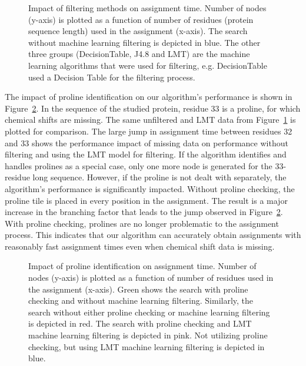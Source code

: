 \documentclass{article}
\begin{document}
\begin{figure}[H]
	\begin{center}
		\resizebox{!}{0.6\textwidth}{}
	\caption{Impact of filtering methods on assignment time. Number of nodes (y-axis) is plotted as a function of number of residues (protein sequence length) used in the assignment (x-axis). The search without machine learning filtering is depicted in blue. The other three groups (DecisionTable, J4.8 and LMT) are the machine learning algorithms that were used for filtering, e.g. DecisionTable used a Decision Table for the filtering process.}
	\label{fig:figure1}
	\end{center}
\end{figure}

\indent The impact of proline identification on our algorithm's performance is shown in Figure~\ref{fig:figure2}. In the sequence of the studied protein, residue 33 is a proline, for which chemical shifts are missing. The same unfiltered and LMT data from Figure~\ref{fig:figure1} is plotted for comparison. The large jump in assignment time between residues 32 and 33 shows the performance impact of missing data on performance without filtering and using the LMT model for filtering. If the algorithm identifies and handles prolines as a special case, only one more node is generated for the 33-residue long sequence. However, if the proline is not dealt with separately, the algorithm's performance is significantly impacted. Without proline checking, the proline tile is placed in every position in the assignment. The result is a major increase in the branching factor that leads to the jump observed in Figure~\ref{fig:figure2}. With proline checking, prolines are no longer problematic to the assignment process. This indicates that our algorithm can accurately obtain assignments with reasonably fast assignment times even when chemical shift data is missing. 

\begin{figure}[H]
	\begin{center}
		\resizebox{!}{0.6\textwidth}{}
	\caption{Impact of proline identification on assignment time. Number of nodes (y-axis) is plotted as a function of number of residues used in the assignment (x-axis). Green shows the search with proline checking and without machine learning filtering. Similarly, the search without either proline checking or machine learning filtering is depicted in red. The search with proline checking and LMT machine learning filtering is depicted in pink. Not utilizing proline checking, but using LMT machine learning filtering is depicted in blue.}
	\label{fig:figure2}
	\end{center}
\end{figure}
\end{document}
